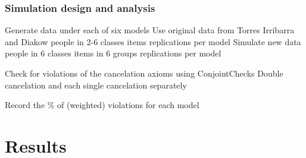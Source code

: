 \documentclass[10pt,serif,professionalfont]{beamer}
\begin{document}
\begin{frame}
    \frametitle{Simulation design and analysis}

        \begin{outline}
        \1 Generate data under each of six models 
        \renewcommand{\outlineii}{enumerate}
            \2 Use original data from Torres Irribarra and Diakow
                 people in 2-6 classes
                 items
                 replications per model
            \2 Simulate new data 
                 people in 6 classes
                 items in 6 groups
                 replications per model
        
        \vspace{0.25cm}
        
        \1 Check for violations of the cancelation axioms using ConjointChecks
        \renewcommand{\outlineii}{itemize}
            \2 Double cancelation and each single cancelation separately

        \vspace{0.25cm}

        \1 Record the \% of (weighted) violations for each model
    \end{outline}

\end{frame}


\section{Results}
\end{document}
